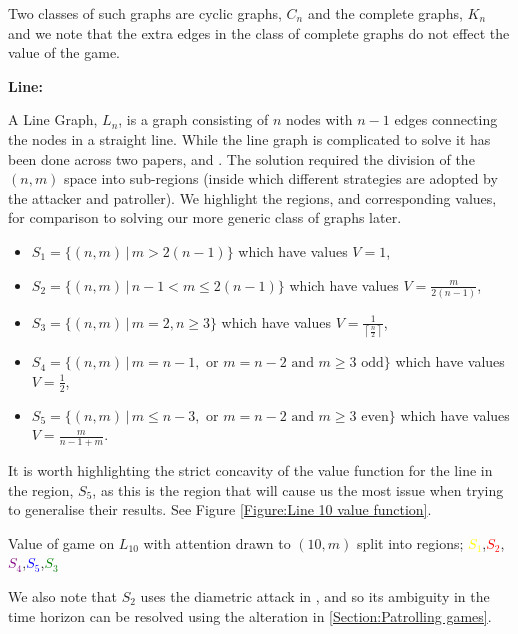 \documentclass[a4paper,10pt]{article}
\newcommand{\ceil}[1]{\left \lceil #1 \right \rceil}
\theoremstyle{definition}
\theoremstyle{definition}
\theoremstyle{remark}
\theoremstyle{definition}
\begin{document}
Two classes of such graphs are cyclic graphs, $C_{n}$ and the complete graphs, $K_{n}$ and we note that the extra edges in the class of complete graphs do not effect the value of the game.

\textbf{Line:}

A Line Graph, $L_{n}$, is a graph consisting of $n$ nodes with $n-1$ edges connecting the nodes in a straight line.  While the line graph is complicated to solve it has been done across two papers, \cite{Alpern2011} and \cite{Papadaki2016}. The solution required the division of the $(n,m)$ space into sub-regions (inside which different strategies are adopted by the attacker and patroller). We highlight the regions, and corresponding values, for comparison to solving our more generic class of graphs later.

\begin{itemize}
\item $S_{1}= \{(n,m) \, | \, m > 2(n-1) \}$ which have values $V=1$,
\item $S_{2}= \{(n,m) \, | \,  n-1 < m \leq 2(n-1) \}$ which have values $V=\frac{m}{2(n-1)}$,
\item $S_{3}= \{(n,m) \, | \, m=2,n\geq 3 \}$ which have values $V=\frac{1}{\ceil{\frac{n}{2}}}$,
\item $S_{4}= \{(n,m) \, | \, m=n-1, \text{ or } m=n-2 \text{ and } m \geq 3 \text{ odd} \}$ which have values $V=\frac{1}{2}$,
\item $S_{5}= \{(n,m) \, | \, m \leq n-3, \text{ or } m=n-2 \text{ and } m \geq 3 \text{ even} \}$ which have values $V=\frac{m}{n-1+m}$.
\end{itemize}

It is worth highlighting the strict concavity of the value function for the line in the region, $S_{5}$, as this is the region that will cause us the most issue when trying to generalise their results. See Figure \ref{Figure:Line 10 value function}.

\begin{myfigure}
\begin{center}

\end{center}
\caption{Value of game on $L_{10}$ with attention drawn to $(10,m)$ split into regions; \textcolor{yellow}{$S_{1}$},\textcolor{red}{$S_{2}$},\textcolor{purple}{$S_{4}$},\textcolor{blue}{$S_{5}$},\textcolor{green}{$S_{3}$}}
\label{Figure:Line 10 value function}
\end{myfigure}

We also note that $S_{2}$ uses the diametric attack in \cite{Papadaki2016}, and so its ambiguity in the time horizon can be resolved using the alteration in \ref{Section:Patrolling games}.
\end{document}
